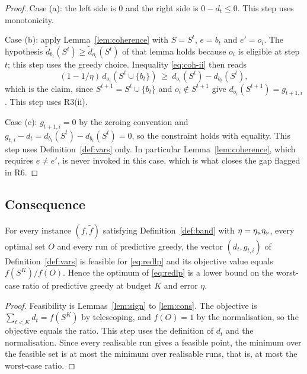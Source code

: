 \begin{proof}
Case (a): the left side is $0$ and the right side is $0 - d_{t} \le 0$. This
step uses monotonicity.

Case (b): apply Lemma~\ref{lem:coherence} with $S = S^{t}$, $e = b_{t}$ and
$e' = o_{i}$. The hypothesis $\tilde d_{b_{t}}(S^{t}) \ge \tilde d_{o_{i}}(S^{t})$
of that lemma holds because $o_{i}$ is eligible at step $t$; this step uses the
greedy choice. Inequality \eqref{eq:coh-ii} then reads
\begin{equation*}
(1 - 1/\eta)\, d_{o_{i}}(S^{t} \cup \{b_{t}\})
\ \ge\ d_{o_{i}}(S^{t}) - d_{b_{t}}(S^{t}),
\end{equation*}
which is the claim, since $S^{t+1} = S^{t} \cup \{b_{t}\}$ and $o_{i} \notin
S^{t+1}$ give $d_{o_{i}}(S^{t+1}) = g_{t+1,i}$. This step uses R3(ii).

Case (c): $g_{t+1,i} = 0$ by the zeroing convention and
$g_{t,i} - d_{t} = d_{b_{t}}(S^{t}) - d_{b_{t}}(S^{t}) = 0$, so the constraint
holds with equality. This step uses Definition~\ref{def:vars} only. In
particular Lemma~\ref{lem:coherence}, which requires $e \ne e'$, is never
invoked in this case, which is what closes the gap flagged in R6.
\end{proof}

\subsection{Consequence}

\begin{lemma}[relaxation]
\label{lem:relaxation}
For every instance $(f, \tilde f)$ satisfying Definition~\ref{def:band} with
$\eta = \eta_{u} \eta_{o}$, every optimal set $O$ and every run of predictive greedy,
the vector $(d_{t}, g_{t,i})$ of Definition~\ref{def:vars} is feasible for
\eqref{eq:redlp} and its objective value equals $f(S^{K}) / f(O)$. Hence the
optimum of \eqref{eq:redlp} is a lower bound on the worst-case ratio of
predictive greedy at budget $K$ and error $\eta$.
\end{lemma}

\begin{proof}
Feasibility is Lemmas~\ref{lem:sign} to \ref{lem:cons}. The objective is
$\sum_{t<K} d_{t} = f(S^{K})$ by telescoping, and $f(O) = 1$ by the
normalisation, so the objective equals the ratio. This step uses the definition
of $d_{t}$ and the normalisation. Since every realisable run gives a feasible
point, the minimum over the feasible set is at most the minimum over realisable
runs, that is, at most the worst-case ratio.
\end{proof}

